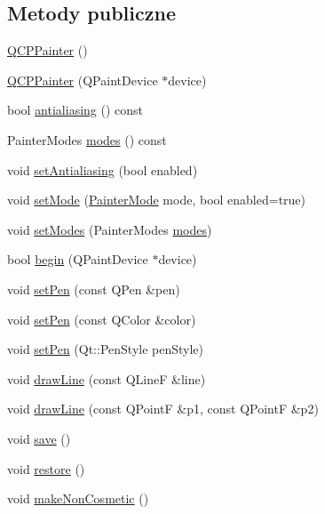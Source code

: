 \subsection*{Metody publiczne}
\begin{DoxyCompactItemize}
\item 
\hyperlink{class_q_c_p_painter_a3c52cb0f43f34573d29bea487da28fe8}{Q\+C\+P\+Painter} ()
\item 
\hyperlink{class_q_c_p_painter_ae58dbb1795ddc4351ab324dc9898aa22}{Q\+C\+P\+Painter} (Q\+Paint\+Device $\ast$device)
\item 
bool \hyperlink{class_q_c_p_painter_a13370d7996315a7150be2fc868da3d4a}{antialiasing} () const 
\item 
Painter\+Modes \hyperlink{class_q_c_p_painter_a99b89eaf5363faaa1e1e6162856f436c}{modes} () const 
\item 
void \hyperlink{class_q_c_p_painter_aaba1deb9188244d9ea65b035112b4d05}{set\+Antialiasing} (bool enabled)
\item 
void \hyperlink{class_q_c_p_painter_af6b1f7d2bbc548b10aa55d8b6ad49577}{set\+Mode} (\hyperlink{class_q_c_p_painter_a156cf16444ff5e0d81a73c615fdb156d}{Painter\+Mode} mode, bool enabled=true)
\item 
void \hyperlink{class_q_c_p_painter_a5fac93adc29c7c4dea9f3e171e9e635e}{set\+Modes} (Painter\+Modes \hyperlink{class_q_c_p_painter_a99b89eaf5363faaa1e1e6162856f436c}{modes})
\item 
bool \hyperlink{class_q_c_p_painter_a0a41146ccd619dceab6e25ec7b46b044}{begin} (Q\+Paint\+Device $\ast$device)
\item 
void \hyperlink{class_q_c_p_painter_af9c7a4cd1791403901f8c5b82a150195}{set\+Pen} (const Q\+Pen \&pen)
\item 
void \hyperlink{class_q_c_p_painter_a5c4d88f21564e156e88ef807f7cf0003}{set\+Pen} (const Q\+Color \&color)
\item 
void \hyperlink{class_q_c_p_painter_a25e76095aae41da0d08035060e5f81ca}{set\+Pen} (Qt\+::\+Pen\+Style pen\+Style)
\item 
void \hyperlink{class_q_c_p_painter_a0b4b1b9bd495e182c731774dc800e6e0}{draw\+Line} (const Q\+LineF \&line)
\item 
void \hyperlink{class_q_c_p_painter_ad1638db27929491b3f1beb74d6cbad5e}{draw\+Line} (const Q\+PointF \&p1, const Q\+PointF \&p2)
\item 
void \hyperlink{class_q_c_p_painter_a8fd6821ee6fecbfa04444c9062912abd}{save} ()
\item 
void \hyperlink{class_q_c_p_painter_a64908e6298d5bbd83457dc987cc3a022}{restore} ()
\item 
void \hyperlink{class_q_c_p_painter_a7e63fbcf47e35c6f2ecd11b8fef7c7d8}{make\+Non\+Cosmetic} ()
\end{DoxyCompactItemize}
